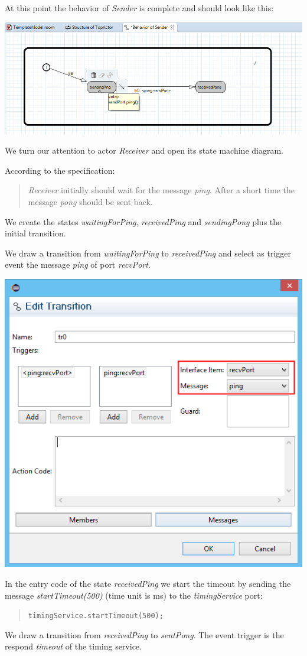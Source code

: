 At this point the behavior of \emph{Sender} is complete and should look like this:

\includegraphics[width=.8\textwidth]{images/015-sending-ping-fsm.png}


We turn our attention to actor \emph{Receiver} and open its state machine diagram.

According to the specification:

\begin{quote}
	\emph{Receiver} initially should wait for the message \emph{ping}. After a short time the message \emph{pong} should be sent back.
\end{quote}

We create the states \emph{waitingForPing}, \emph{receivedPing} and \emph{sendingPong} plus the initial transition.

We draw a transition from \emph{waitingForPing} to \emph{receivedPing} and select as trigger event the message \emph{ping} of port \emph{recvPort}.

\includegraphics[width=.5\textwidth]{images/015-transition-ping.png}

In the entry code of the state \emph{receivedPing} we start the timeout by sending the message \emph{startTimeout(500)} (time unit is ms) to the \emph{timingService} port:
\begin{quote}
\verb|timingService.startTimeout(500);|
\end{quote}

We draw a transition from \emph{receivedPing} to \emph{sentPong}. The event trigger is the respond \emph{timeout} of the timing service.

